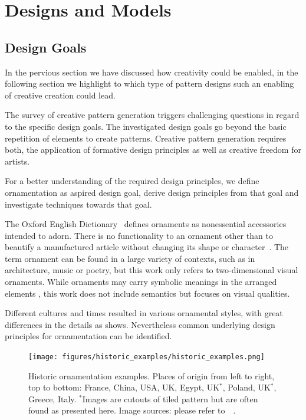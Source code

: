 
\section{Designs and Models}


\subsection{Design Goals}
\label{sec:design_goals}

In the pervious section we have discussed how creativity could be enabled, in the following section we highlight to which type of pattern designs such an enabling of creative creation could lead.


The survey of creative pattern generation triggers challenging questions in regard to the specific design goals. The investigated design goals go beyond the basic repetition of elements to create patterns. Creative pattern generation requires both, the application of formative design principles as well as creative freedom for artists.

For a better understanding of the required design principles, we define ornamentation as aspired design goal, derive design principles from that goal and investigate techniques towards that goal.

The Oxford English Dictionary~\cite{oed_2017} defines ornaments as nonessential accessories intended to adorn. There is no functionality to an ornament other than to beautify a manufactured article without changing its shape or character~\cite{ward_1896_tpo}. The term ornament can be found in a large variety of contexts, such as in architecture, music or poetry, but this work only refers to two-dimensional visual ornaments. While ornaments may carry symbolic meanings in the arranged elements \cite{wornum_1896_aof}, this work does not include semantics but focuses on visual qualities.

Different cultures and times resulted in various ornamental styles, with great differences in the details as  shows. Nevertheless common underlying design principles for ornamentation can be identified.

\begin{figure}
       \texttt{[image: figures/historic\_examples/historic\_examples.png]}
        \caption[Historic ornamentation examples]{\label{fig:historic_examples} Historic ornamentation examples. Places of origin from left to right, top to bottom:  France, China, USA, UK, Egypt, UK$^{*}$, Poland, UK$^{*}$, Greece, Italy. $^{*}$Images are cutouts of tiled pattern but are often found as presented here. Image sources: please refer to~~.}
\end{figure}

